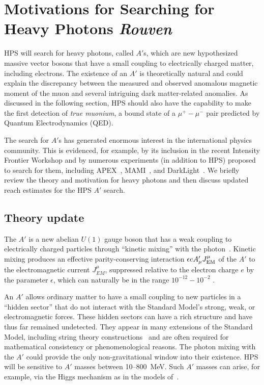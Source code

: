 


\section{Motivations for Searching for Heavy Photons {\it Rouven}}


HPS will search for heavy photons, called $A'$s, which are new hypothesized massive vector bosons that have a small coupling 
to electrically charged matter, including electrons.  
The existence of an $A'$ is theoretically natural and could explain the discrepancy between the measured and 
observed anomalous magnetic moment of the muon and several intriguing dark matter-related anomalies.  
As discussed in the following section, HPS should also have the capability to make the first detection of \emph{true muonium}, a bound state of a 
$\mu^+ - \mu^-$ pair predicted by Quantum Electrodynamics (QED).  

The search for $A'$s has generated enormous interest in the international physics community.  This is evidenced, for example, 
by its inclusion in the recent Intensity Frontier Workshop \cite{Kamionkowski:2010mi} and by numerous  
experiments (in addition to HPS) proposed to search for them, including 
APEX~\cite{Essig:2010xa,Abrahamyan:2011gv},  MAMI~\cite{Merkel:2011ze}, and DarkLight~\cite{Freytsis:2009bh}.
We briefly review the theory and motivation for heavy photons  and then discuss updated 
reach estimates for the HPS $A'$ search.

\subsection{Theory update}

The $A'$ is a new abelian $U(1)$ gauge boson that has a weak coupling 
to electrically charged particles through ``kinetic mixing'' with the photon~\cite{Holdom:1985ag,Galison:1983pa}.  
Kinetic mixing produces an effective parity-conserving interaction
$\epsilon e A'_\mu J^\mu_{\rm EM}$ of the $A'$ to the 
electromagnetic current $J^\mu_{EM}$,  suppressed relative to the electron charge 
$e$ by the parameter $\epsilon$, which 
can naturally be in the range $10^{-12} -10^{-2}$ \cite{Essig:2009nc,Goodsell:2009xc,Cicoli:2011yh,Goodsell:2011wn}. 

An $A'$ allows ordinary matter to have a small coupling to new particles in a ``hidden sector'' 
that do not interact with the Standard Model's strong, weak, or 
electromagnetic forces.  These hidden sectors can have a rich structure and have thus far remained undetected.  
They appear in many extensions of the Standard Model, including string theory 
constructions~\cite{Goodsell:2010ie,NSF-ITP-84-170,PRINT-86-0084 (PRINCETON),Andreas:2011in,arXiv:1002.0329}
and are often required for mathematical consistency or phenomenological reasons.
The photon mixing with the $A'$ could provide the only non-gravitational window into 
their existence.   
HPS will be sensitive to $A'$ masses between 10--800~MeV. 
Such $A'$ masses can arise, for example, via the Higgs mechanism as in the models 
of~\cite{Fayet:2007ua,Cheung:2009qd,ArkaniHamed:2008qp,Morrissey:2009ur}.  

